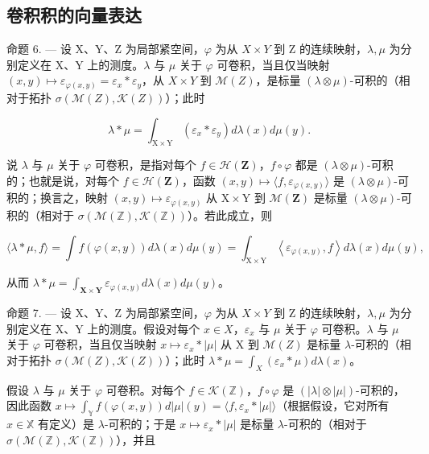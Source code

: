\subsection{卷积积的向量表达}

命题 6. --- 设 X、Y、Z 为局部紧空间，\(\varphi\) 为从 \(X \times Y\) 到 Z 的连续映射，\(\lambda, \mu\) 为分别定义在 X、Y 上的测度。\(\lambda\) 与 \(\mu\) 关于 \(\varphi\) 可卷积，当且仅当映射 \((x,y) \mapsto \varepsilon_{\varphi(x,y)} = \varepsilon_x * \varepsilon_y\)，从 \(X \times Y\) 到 \(\mathcal{M}(Z)\)，是标量 \((\lambda \otimes \mu)\)-可积的（相对于拓扑 \(\sigma(\mathcal{M}(Z), \mathcal{K}(Z))\)）；此时

\[
\lambda * \mu = \int_ {\mathrm{X} \times \mathrm{Y}} \left(\varepsilon_ {x} * \varepsilon_ {y}\right) d \lambda (x) d \mu (y).
\]

说 \(\lambda\) 与 \(\mu\) 关于 \(\varphi\) 可卷积，是指对每个 \(f \in \mathcal{H}(\mathbf{Z})\)，\(f \circ \varphi\) 都是 \((\lambda \otimes \mu)\)-可积的；也就是说，对每个 \(f \in \mathcal{H}(\mathbf{Z})\)，函数 \((x,y) \mapsto \langle f, \varepsilon_{\varphi(x,y)} \rangle\) 是 \((\lambda \otimes \mu)\)-可积的；换言之，映射 \((x,y) \mapsto \varepsilon_{\varphi(x,y)}\) 从 \(\mathrm{X} \times \mathrm{Y}\) 到 \(\mathcal{M}(\mathbf{Z})\) 是标量 \((\lambda \otimes \mu)\)-可积的（相对于 \(\sigma (\mathcal{M}(\mathbb{Z}),\mathcal{K}(\mathbb{Z}))\)）。若此成立，则

\[
\langle \lambda * \mu , f \rangle = \int f (\varphi (x, y)) d \lambda (x) d \mu (y) = \int_ {\mathrm{X} \times \mathrm{Y}} \left\langle \varepsilon_ {\varphi (x, y)}, f \right\rangle d \lambda (x) d \mu (y),
\]

从而 \(\lambda * \mu = \int_{\mathbf{X} \times \mathbf{Y}} \varepsilon_{\varphi(x, y)} d\lambda(x) d\mu(y)\)。

命题 7. --- 设 X、Y、Z 为局部紧空间，\(\varphi\) 为从 \(X \times Y\) 到 Z 的连续映射，\(\lambda, \mu\) 为分别定义在 X、Y 上的测度。假设对每个 \(x \in X\)，\(\varepsilon_x\) 与 \(\mu\) 关于 \(\varphi\) 可卷积。\(\lambda\) 与 \(\mu\) 关于 \(\varphi\) 可卷积，当且仅当映射 \(x \mapsto \varepsilon_x * |\mu|\) 从 X 到 \(\mathcal{M}(Z)\) 是标量 \(\lambda\)-可积的（相对于拓扑 \(\sigma(\mathcal{M}(Z), \mathcal{K}(Z))\)）；此时 \(\lambda * \mu = \int_{X} (\varepsilon_x * \mu) d\lambda(x)\)。

假设 \(\lambda\) 与 \(\mu\) 关于 \(\varphi\) 可卷积。对每个 \(f \in \mathcal{K}(\mathbb{Z})\)，\(f \circ \varphi\) 是 \((|\lambda| \otimes |\mu|)\)-可积的，因此函数 \(x \mapsto \int_{\mathbb{Y}} f(\varphi(x, y)) d|\mu|(y) = \langle f, \varepsilon_x * |\mu| \rangle\)（根据假设，它对所有 \(x \in \mathbb{X}\) 有定义）是 \(\lambda\)-可积的；于是 \(x \mapsto \varepsilon_x * |\mu|\) 是标量 \(\lambda\)-可积的（相对于 \(\sigma(\mathcal{M}(\mathbb{Z}), \mathcal{K}(\mathbb{Z}))\)），并且

